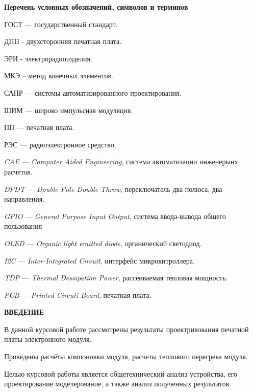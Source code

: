 \tableofcontents
\newpage
\begin{center}
\textbf{Перечень условных обозначений, символов и терминов}
\end{center}

ГОСТ — государственный стандарт.

ДПП - двухсторонняя печатная плата.

ЭРИ - электрорадиоизделия.

МКЭ – метод конечных элементов.

САПР — системы автоматизированного проектирования.

ШИМ — широко импульсная модуляция.

ПП — печатная плата.

РЭС — радиоэлектронное средство.



\textit{CAE} — \textit{Computer Aided Engineering}, система автоматизации инженерынх расчетов.

\textit{DPDT} — \textit{Double Pole Double Throw}, переключатель два полюса, два направления.

\textit{GPIO} — \textit{ General Purpose Input Output}, система ввода-вывода общего пользования

\textit{OLED} — \textit{Organic light emitted diode}, органический светодиод.

\textit{I2C} — \textit{Inter-Integrated Circuit}, интерфейс микрокнтроллера.

\textit{TDP} — \textit{Thermal Dessipation Power}, рассеиваемая тепловая мощность.

\textit{PCB} — \textit{Printed Circuti Board}, печатная плата.

\newpage

\begin{center}
\textbf{ВВЕДЕНИЕ}
\end{center}


В данной курсовой работе рассмотрены результаты проектривования 
печатной платы электронного модуля.

Проведены расчёты компоновки модуля, расчеты теплового перегрева
модуля.

Целью курсовой работы является общетехнический анализ устройства,
его проектирование моделерование, а также анализ полученных результатов.

\newpage

